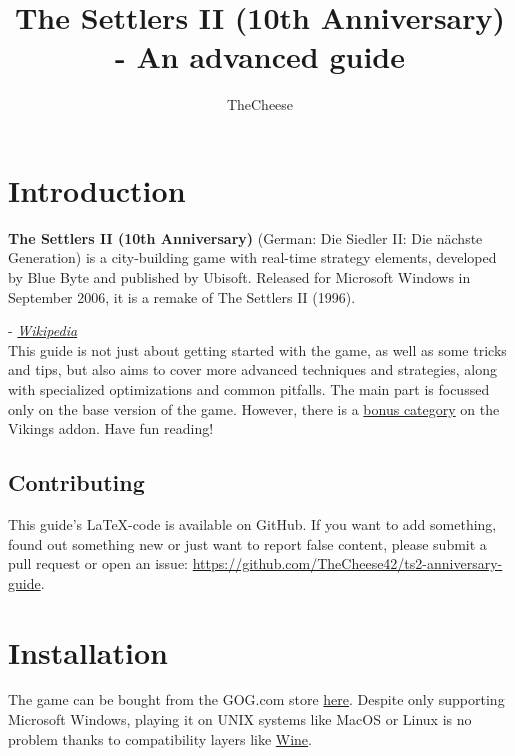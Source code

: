 \documentclass[12pt]{article}
\title{\titlefont The Settlers II (10th Anniversary) - An advanced guide}
\author{TheCheese}
\date{}
\begin{document}
\maketitle

\vspace{2cm}

\begingroup
  \hypersetup{hidelinks}
  \tableofcontents
\endgroup


\section{Introduction}
\label{sec:introduction}

\begin{displayquote}
\textbf{The Settlers II (10th Anniversary)} (German: Die Siedler II: Die nächste Generation) is a city-building game with real-time strategy elements, developed by Blue Byte and published by Ubisoft. Released for Microsoft Windows in September 2006, it is a remake of The Settlers II (1996).
\end{displayquote}
\hspace{2cm}- \textit{\href{https://en.wikipedia.org/wiki/The_Settlers_II_(10th_Anniversary)}{Wikipedia}}\\

This guide is not just about getting started with the game, as well as some tricks and tips, but also aims to cover more advanced techniques and strategies, along with specialized optimizations and common pitfalls. The main part is focussed only on the base version of the game. However, there is a \hyperref[sec:vikings]{bonus category} on the Vikings addon. Have fun reading!

\subsection{Contributing}
\label{sec:contributing}

This guide's \LaTeX-code is available on GitHub. If you want to add something, found out something new or just want to report false content, please submit a pull request or open an issue: \url{https://github.com/TheCheese42/ts2-anniversary-guide}.

\section{Installation}
\label{sec:installation}

The game can be bought from the GOG.com store \href{https://www.gog.com/en/game/the_settlers_2_10th_anniversary}{here}. Despite only supporting Microsoft Windows, playing it on UNIX systems like MacOS or Linux is no problem thanks to compatibility layers like \href{https://www.winehq.org}{Wine}.
\end{document}
